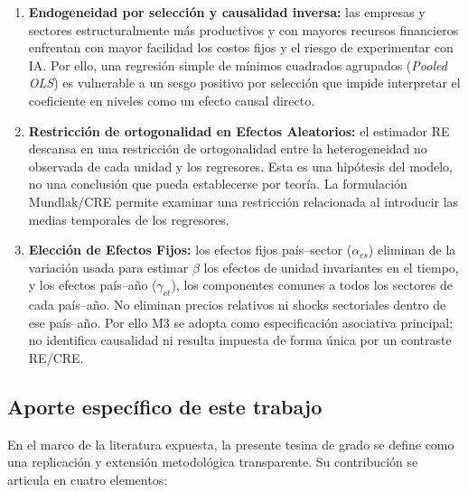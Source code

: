 \documentclass[12pt,a4paper]{article}
\begin{document}
\begin{enumerate}

    \item \textbf{Endogeneidad por selección y causalidad inversa:} las empresas y sectores estructuralmente más productivos y con mayores recursos financieros enfrentan con mayor facilidad los costos fijos y el riesgo de experimentar con IA. Por ello, una regresión simple de mínimos cuadrados agrupados (\textit{Pooled OLS}) es vulnerable a un sesgo positivo por selección que impide interpretar el coeficiente en niveles como un efecto causal directo.

    \item \textbf{Restricción de ortogonalidad en Efectos Aleatorios:} el estimador RE descansa en una restricción de ortogonalidad entre la heterogeneidad no observada de cada unidad y los regresores. Esta es una hipótesis del modelo, no una conclusión que pueda establecerse por teoría. La formulación Mundlak/CRE permite examinar una restricción relacionada al introducir las medias temporales de los regresores.

    \item \textbf{Elección de Efectos Fijos:} los efectos fijos país--sector ($\alpha_{cs}$) eliminan de la variación usada para estimar $\beta$ los efectos de unidad invariantes en el tiempo, y los efectos país--año ($\gamma_{ct}$), los componentes comunes a todos los sectores de cada país--año. No eliminan precios relativos ni shocks sectoriales dentro de ese país--año. Por ello M3 se adopta como especificación asociativa principal; no identifica causalidad ni resulta impuesta de forma única por un contraste RE/CRE.

\end{enumerate}

\subsection{Aporte específico de este trabajo}

En el marco de la literatura expuesta, la presente tesina de grado se define como una replicación y extensión metodológica transparente. Su contribución se articula en cuatro elementos:
\end{document}
